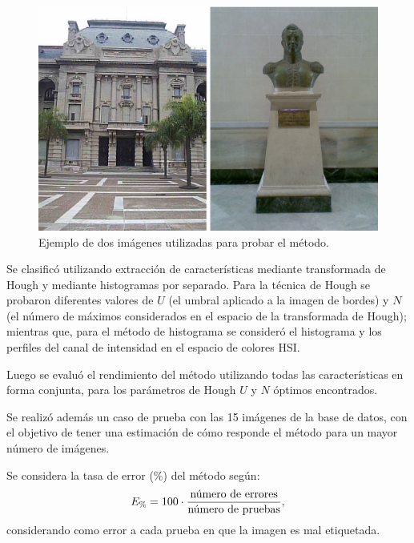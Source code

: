 \documentclass[conference,a4paper,10pt,oneside,final]{tfmpd}
\begin{document}
\begin{figure}
\begin{center}
\includegraphics[scale=0.25]{../diagramas/dibujo}
\end{center}
\caption{Ejemplo de dos imágenes utilizadas para probar el método.}
\label{imagenes}
\end{figure}

Se clasificó utilizando extracción de características mediante
transformada de Hough y mediante histogramas por separado.
Para la técnica de Hough se probaron diferentes valores de $U$ (el umbral
aplicado a la imagen de bordes) y $N$ (el número de máximos considerados
en el espacio de la transformada de Hough); mientras que,
para el método de histograma se consideró el histograma y los perfiles
del canal de intensidad en el espacio de colores HSI.

Luego se evaluó el rendimiento del método utilizando todas las características
en forma conjunta, para los parámetros de Hough $U$ y $N$ óptimos encontrados.

Se realizó además un {caso de prueba} con las 15 %
imágenes de la base de datos, %
 con el objetivo de tener una estimación de cómo responde
el método para un mayor número de imágenes.

Se considera la tasa de error ($\%$) del método según:
\begin{equation}
E_\%=100\cdot\frac{\textrm{número de errores}}{\textrm{número de pruebas}},
\end{equation}
considerando como error a cada prueba en que la imagen es mal etiquetada.
\end{document}
